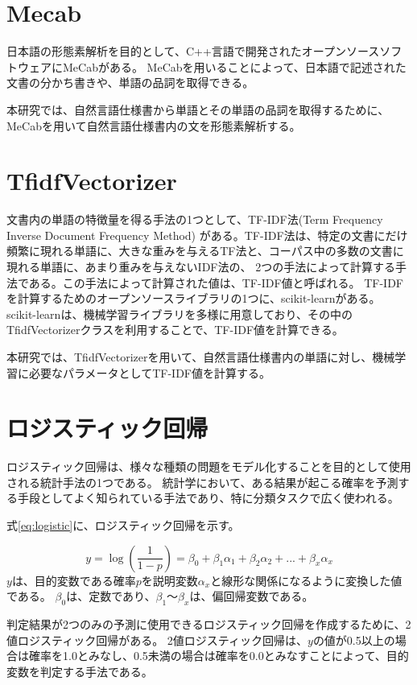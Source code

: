 \section{Mecab}
\label{sec:mecab}
日本語の形態素解析を目的として、C++言語で開発されたオープンソースソフトウェアにMeCabがある\cite{mecab}。
MeCabを用いることによって、日本語で記述された文書の分かち書きや、単語の品詞を取得できる。

本研究では、自然言語仕様書から単語とその単語の品詞を取得するために、MeCabを用いて自然言語仕様書内の文を形態素解析する。

\section{TfidfVectorizer}
\label{sec:tfidf}
文書内の単語の特徴量を得る手法の1つとして、TF-IDF法(Term Frequency Inverse Document Frequency Method)
がある\cite{TF}。TF-IDF法は、特定の文書にだけ頻繁に現れる単語に、大きな重みを与えるTF法と、コーパス中の多数の文書に現れる単語に、あまり重みを与えないIDF法の、
2つの手法によって計算する手法である。この手法によって計算された値は、TF-IDF値と呼ばれる。
TF-IDFを計算するためのオープンソースライブラリの1つに、scikit-learnがある\cite{cite6}。
scikit-learnは、機械学習ライブラリを多様に用意しており、その中のTfidfVectorizerクラスを利用することで、TF-IDF値を計算できる。

本研究では、TfidfVectorizerを用いて、自然言語仕様書内の単語に対し、機械学習に必要なパラメータとしてTF-IDF値を計算する。

\section{ロジスティック回帰}
\label{sec:logistic}
ロジスティック回帰は、様々な種類の問題をモデル化することを目的として使用される統計手法の1つである。
統計学において、ある結果が起こる確率を予測する手段としてよく知られている手法であり、特に分類タスクで広く使われる。

式\ref{eq:logistic}に、ロジスティック回帰を示す。

\begin{equation}\label{eq:logistic}
    y = \log{(\frac{1}{1-p})}= \beta_{0}+ \beta_{1}\alpha_{1}+\beta_{2}\alpha_{2}+...+\beta_{x}\alpha_{x}
\end{equation}
$y$は、目的変数である確率$p$を説明変数$\alpha_{x}$と線形な関係になるように変換した値である。
$\beta_{0}$は、定数であり、$\beta_{1}～\beta_{x}$は、偏回帰変数である。

判定結果が2つのみの予測に使用できるロジスティック回帰を作成するために、2値ロジスティック回帰がある\cite{two_logistic}。
2値ロジスティック回帰は、$y$の値が0.5以上の場合は確率を1.0とみなし、0.5未満の場合は確率を0.0とみなすことによって、目的変数を判定する手法である。

